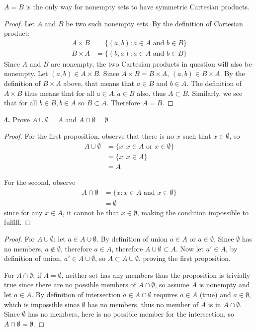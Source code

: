 \documentclass[12pt]{amsart}
\newenvironment{statement}[1]{\smallskip\noindent\color[rgb]{1.00,0.00,0.50} {\bf #1.}}{}
\theoremstyle{definition}
\theoremstyle{remark}
\begin{document}
$A = B$ is the only way for nonempty sets to have symmetric Cartesian
products.
\begin{proof}
Let $A$ and $B$ be two such nonempty sets. By the definition of Cartesian product:
\begin{align*}
  A \times B &= \{ (a,b) : a \in A \text{ and } b \in B \} \\
  B \times A &= \{ (b,a) : a \in A \text{ and } b \in B \}
\end{align*}
Since $A$ and $B$ are nonempty, the two Cartesian products in question
will also be nonempty. Let $(a,b) \in A \times B$. Since $A \times B =
B \times A$, $(a,b) \in B \times A$. By the definition of $B \times A$
above, that means that $a \in B$ and $b \in A$. The definition of $A
\times B$ thus means that for all $a \in A, a \in B$ also, thus $A
\subset B$. Similarly, we see that for all $b \in B, b \in A$ so $B
\subset A$. Therefore $A=B$.
\end{proof}


\begin{statement}{4}
Prove $A \cup \emptyset = A$ and $A \cap \emptyset = \emptyset $
\end{statement}
\begin{proof}
  For the first proposition, observe that there is no $x$ such that $x \in \emptyset$, so
  \begin{align*}
    A \cup \emptyset &= \{ x : x \in A \text{ or } x \in \emptyset \} \\
    &= \{ x : x \in A \} \\
    &= A
  \end{align*}

  For the second, observe
  \begin{align*}
    A \cap \emptyset &= \{ x : x \in A \text{ and } x \in \emptyset \} \\
    &= \emptyset
  \end{align*}
  since for any $x \in A$, it cannot be that $x \in \emptyset$, making
  the condition impossible to fulfill.
\end{proof}

\begin{proof}
For $A \cup \emptyset$: let $a \in A \cup \emptyset$. By definition of
union $a \in A$ or $a \in \emptyset$. Since $\emptyset$ has no
members, $a \notin \emptyset$, therefore $a \in A$, therefore $A \cup
\emptyset \subset A$. Now let $a' \in A$, by definition of union, $a'
\in A \cup \emptyset$, so $A \subset A \cup \emptyset$, proving the
first proposition.

For $A \cap \emptyset$: if $A = \emptyset$, neither set has any
members thus the proposition is trivially true since there are no
possible members of $A \cap \emptyset$, so assume $A$ is nonempty and
let $a \in A$. By definition of intersection $a \in A \cap \emptyset$
requires $a \in A$ (true) and $a \in \emptyset$, which is impossible
since $\emptyset$ has no members, thus no member of $A$ is in $A \cap
\emptyset$. Since $\emptyset$ has no members, here is no possible
member for the intersection, so $A \cap \emptyset = \emptyset$.
\end{proof}
\end{document}
